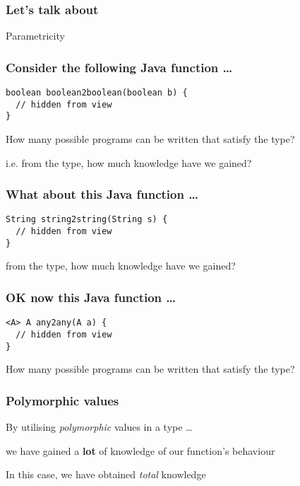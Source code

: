 \begin{frame}[fragile]
\frametitle{Let's talk about}
\begin{center}
Parametricity
\end{center}
\end{frame}

\begin{frame}[fragile]
\frametitle{Consider the following Java function \ldots}
\begin{block}{}
\begin{lstlisting}[style=java]
boolean boolean2boolean(boolean b) {
  // hidden from view 
}
\end{lstlisting}
\end{block}
\begin{center}
How many possible programs can be written that satisfy the type?

i.e. from the type, how much knowledge have we gained?
\end{center}
\end{frame}

\begin{frame}[fragile]
\frametitle{What about this Java function \ldots}
\begin{block}{}
\begin{lstlisting}[style=java]
String string2string(String s) {
  // hidden from view 
}
\end{lstlisting}
\end{block}
\begin{center}
from the type, how much knowledge have we gained?
\end{center}
\end{frame}

\begin{frame}[fragile]
\frametitle{OK now this Java function \ldots}
\begin{block}{}
\begin{lstlisting}[style=java]
<A> A any2any(A a) {
  // hidden from view 
}
\end{lstlisting}
\end{block}
\begin{center}
How many possible programs can be written that satisfy the type?
\end{center}
\end{frame}

\begin{frame}[fragile]
\frametitle{Polymorphic values}
\begin{block}{By utilising \emph{polymorphic} values in a type \ldots}
\begin{center}
we have gained a \textbf{lot} of knowledge of our function's behaviour

In this case, we have obtained \emph{total} knowledge
\end{center}
\end{block}
\end{frame}

